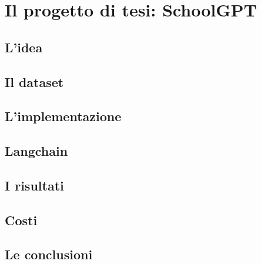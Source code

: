 \chapter{Il progetto di tesi: SchoolGPT}
\section{L'idea}

\section{Il dataset}

\section{L'implementazione}

\section{Langchain}
\section{I risultati}
\section{Costi}
\section{Le conclusioni}